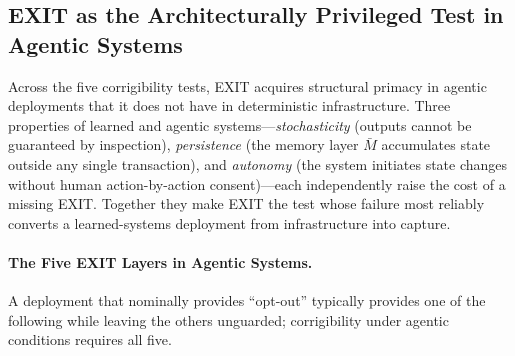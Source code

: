 \documentclass{article}
\theoremstyle{definition}
\begin{document}
\subsection{EXIT as the Architecturally Privileged Test in Agentic Systems}
\label{subsec:exit-privileged}

Across the five corrigibility tests, EXIT acquires structural primacy in agentic deployments that it does not have in deterministic infrastructure. Three properties of learned and agentic systems---\textit{stochasticity} (outputs cannot be guaranteed by inspection), \textit{persistence} (the memory layer $\bar{M}$ accumulates state outside any single transaction), and \textit{autonomy} (the system initiates state changes without human action-by-action consent)---each independently raise the cost of a missing EXIT. Together they make EXIT the test whose failure most reliably converts a learned-systems deployment from infrastructure into capture.

\paragraph{The Five EXIT Layers in Agentic Systems.} A deployment that nominally provides ``opt-out'' typically provides one of the following while leaving the others unguarded; corrigibility under agentic conditions requires all five.
\end{document}
